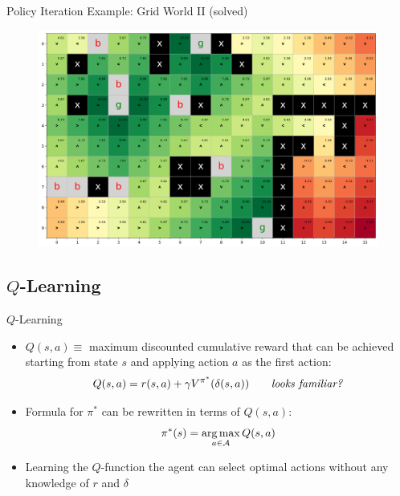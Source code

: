 \begin{frame}[plain]{Policy Iteration Example: Grid World II (solved)}{}
	\begin{figure}
		\centering
		\includegraphics[scale=0.3]{14_rl/02_img/optimal_policy_pi}
	\end{figure}
\end{frame}


\subsection{$Q$-Learning}

\begin{frame}{$Q$-Learning}{}
	\begin{itemize}
		\item $Q(s, a) \equiv$ maximum discounted cumulative reward that can be achieved starting from state $s$
			and applying action $a$ as the first action:
		\begin{equation}
			Q(s, a) = r(s, a) + \gamma V^{\pi^*}(\delta(s, a)) \qquad \text{\textit{looks familiar?}}
		\end{equation}
		\item Formula for $\pi^*$ can be rewritten in terms of $Q(s, a)$:
		\begin{equation}
			\pi^*(s) = \operatorname*{arg\,max}_{a \in \mathcal{A}} Q(s, a)
		\end{equation}
		\item {} Learning the $Q$-function the agent can select optimal actions
			without any knowledge of $r$ and $\delta$
	\end{itemize}
\end{frame}



